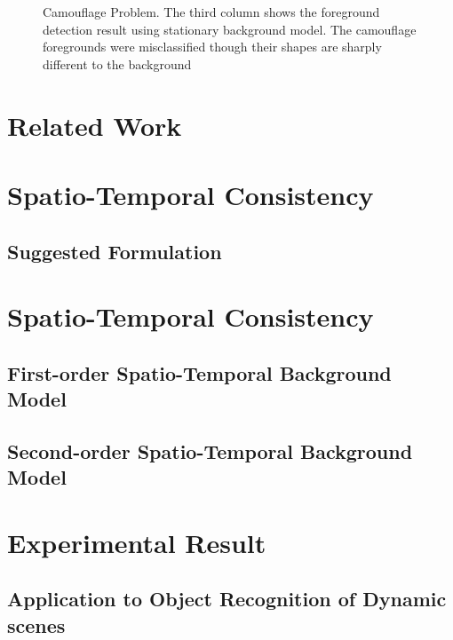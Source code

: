 \documentclass[a4paper,twocolumn, 10pt]{article}
\begin{document}
\begin{figure}[t]
  \begin{center}
  \label{fig10}
  \hfill
  \hfill
  \caption{Camouflage Problem. The third column shows the foreground detection result using stationary background model. The camouflage foregrounds were misclassified though their shapes are sharply different to the background}
  \end{center}
\end{figure}



\section{Related Work}


\section{Spatio-Temporal Consistency}


\subsection{Suggested Formulation}



\section{Spatio-Temporal Consistency}

\subsection{First-order Spatio-Temporal Background Model}

\subsection{Second-order Spatio-Temporal Background Model}



\section{Experimental Result}


\subsection{Application to Object Recognition of Dynamic scenes}
\end{document}
